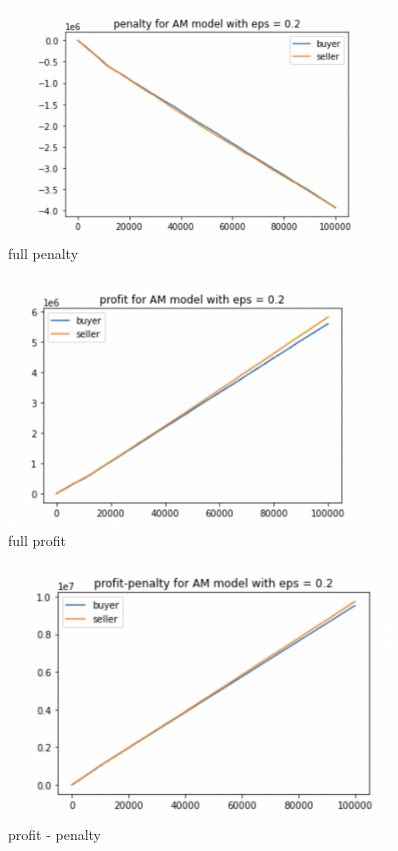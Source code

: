 \documentclass[11pt]{article}
\begin{document}
\begin{figure}[H]
	\begin{center}
	\includegraphics[width=0.9\textwidth]{49.PNG}
	\end{center}
	\caption{full penalty}
	\label{FIG.49}
\end{figure}

\begin{figure}[H]
	\begin{center}
	\includegraphics[width=0.9\textwidth]{50.PNG}
	\end{center}
	\caption{full profit}
	\label{FIG.50}
\end{figure}

\begin{figure}[H]
	\begin{center}
	\includegraphics[width=0.9\textwidth]{51.PNG}
	\end{center}
	\caption{profit - penalty}
	\label{FIG.51}
\end{figure}	
\end{document}
